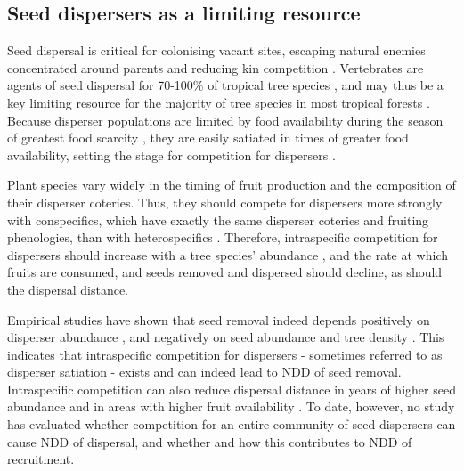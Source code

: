 \documentclass[b5paper,justified]{tufte-book} %
\begin{document}
\begin{fullwidth}
\subsection{Seed dispersers as a limiting resource}
Seed dispersal is critical for colonising vacant sites, escaping natural enemies concentrated around parents and reducing kin competition \citep{Nathan2000}. Vertebrates are agents of seed dispersal for 70-100\% of tropical tree species \citep{Willson1989}, and may thus be a key limiting resource for the majority of tree species in most tropical forests \citep{Howe1977, Manasse1983}. Because disperser populations are limited by food availability
during the season of greatest food scarcity \citep{Leigh1999}, they are easily satiated in times of greater food availability, setting the stage for competition for dispersers \citep[e.g.][]{Wheelwright1985, Hampe2008}.

Plant species vary widely in the timing of fruit production and the composition of their disperser coteries. Thus, they should compete for dispersers more strongly with conspecifics, which have exactly the same disperser coteries and fruiting phenologies, than with heterospecifics \citep{Howe1977}. Therefore, intraspecific competition for dispersers should increase with a tree species' abundance \citep{Hampe2008}, and the rate at which fruits are consumed, and seeds removed and dispersed should decline, as should the dispersal distance. 

Empirical studies have shown that seed removal indeed depends positively on disperser abundance \citep[e.g.][]{Alcantara1997}, and negatively on seed abundance \citep[e.g.][]{Jansen2004} and tree density \citep[e.g.][]{Manasse1983,Beck2002}. This indicates that intraspecific competition for dispersers - sometimes referred to as disperser satiation - exists and can indeed lead to NDD of seed removal. Intraspecific competition can also reduce dispersal distance in years of higher seed abundance \citep{VanderWall2002, Jansen2004} and in areas with higher fruit availability \citep{Galvez2009, Klinger2009, Morales2012}. To date, however, no study has evaluated whether competition for an entire community of seed dispersers can cause NDD of dispersal, and whether and how this contributes to NDD of recruitment.


\end{fullwidth}
\end{document}
